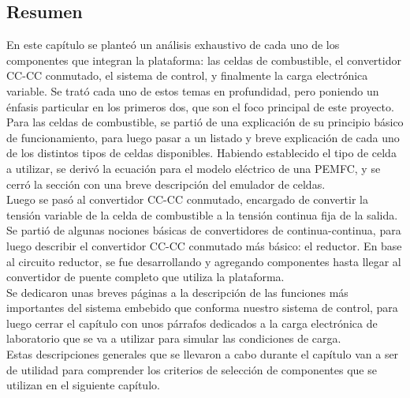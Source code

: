 \subsection{Resumen}

En este capítulo se planteó un análisis exhaustivo de cada uno de los componentes que integran la plataforma: las celdas de combustible, el convertidor CC-CC conmutado, el sistema de control, y finalmente la carga electrónica variable. Se trató cada uno de estos temas en profundidad, pero poniendo un énfasis particular en los primeros dos, que son el foco principal de este proyecto.\\

Para las celdas de combustible, se partió de una explicación de su principio básico de funcionamiento, para luego pasar a un listado y breve explicación de cada uno de los distintos tipos de celdas disponibles. Habiendo establecido el tipo de celda a utilizar, se derivó la ecuación para el modelo eléctrico de una PEMFC, y se cerró la sección con una breve descripción del emulador de celdas.\\

Luego se pasó al convertidor CC-CC conmutado, encargado de convertir la tensión variable de la celda de combustible a la tensión continua fija de la salida. Se partió de algunas nociones básicas de convertidores de continua-continua, para luego describir el convertidor CC-CC conmutado más básico: el reductor. En base al circuito reductor, se fue desarrollando y agregando componentes hasta llegar al convertidor de puente completo que utiliza la plataforma.\\

Se dedicaron unas breves páginas a la descripción de las funciones más importantes del sistema embebido que conforma nuestro sistema de control, para luego cerrar el capítulo con unos párrafos dedicados a la carga electrónica de laboratorio que se va a utilizar para simular las condiciones de carga.\\

Estas descripciones generales que se llevaron a cabo durante el capítulo van a ser de utilidad para comprender los criterios de selección de componentes que se utilizan en el siguiente capítulo.\\